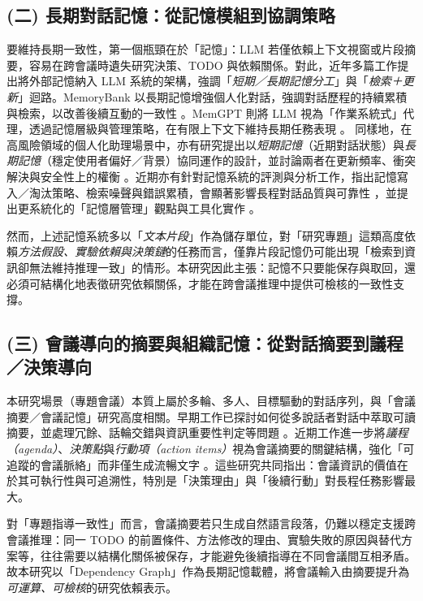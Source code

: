 \subsection*{(二) 長期對話記憶：從記憶模組到協調策略}
要維持長期一致性，第一個瓶頸在於「記憶」：LLM 若僅依賴上下文視窗或片段摘要，容易在跨會議時遺失研究決策、TODO 與依賴關係。對此，近年多篇工作提出將外部記憶納入 LLM 系統的架構，強調「\emph{短期／長期記憶分工}」與「\emph{檢索＋更新}」迴路。MemoryBank 以長期記憶增強個人化對話，強調對話歷程的持續累積與檢索，以改善後續互動的一致性 \citep{a2305_10250v3_memorybank}。MemGPT 則將 LLM 視為「作業系統式」代理，透過記憶層級與管理策略，在有限上下文下維持長期任務表現 \citep{a2310_08560v2_memgpt}。
同樣地，在高風險領域的個人化助理場景中，亦有研究提出以\emph{短期記憶}（近期對話狀態）與\emph{長期記憶}（穩定使用者偏好／背景）協同運作的設計，並討論兩者在更新頻率、衝突解決與安全性上的權衡 \citep{zhang-etal-2024-llm-based}。近期亦有針對記憶系統的評測與分析工作，指出記憶寫入／淘汰策略、檢索噪聲與錯誤累積，會顯著影響長程對話品質與可靠性 \citep{a2402_17753v1_locomomemoryeval,a2505_16067v2_memorymanagementimpacts}，並提出更系統化的「記憶層管理」觀點與工具化實作 \citep{a2504_19413v1_mem0,a2507_07957v1_mirix}。

然而，上述記憶系統多以「\emph{文本片段}」作為儲存單位，對「研究專題」這類高度依賴\emph{方法假設、實驗依賴與決策鏈}的任務而言，僅靠片段記憶仍可能出現「檢索到資訊卻無法維持推理一致」的情形。本研究因此主張：記憶不只要能保存與取回，還必須可結構化地表徵研究依賴關係，才能在跨會議推理中提供可檢核的一致性支撐。

\subsection*{(三) 會議導向的摘要與組織記憶：從對話摘要到議程／決策導向}
本研究場景（專題會議）本質上屬於多輪、多人、目標驅動的對話序列，與「會議摘要／會議記憶」研究高度相關。早期工作已探討如何從多說話者對話中萃取可讀摘要，並處理冗餘、話輪交錯與資訊重要性判定等問題 \citep{zechner2001concise_dialogue_summaries,wang-cardie-2011-summarizing}。近期工作進一步將\emph{議程（agenda）}、\emph{決策點}與\emph{行動項（action items）}視為會議摘要的關鍵結構，強化「可追蹤的會議脈絡」而非僅生成流暢文字 \citep{liu2025agendaaware_meetingsum,laskar-etal-2023-building}。這些研究共同指出：會議資訊的價值在於其可執行性與可追溯性，特別是「決策理由」與「後續行動」對長程任務影響最大。

對「專題指導一致性」而言，會議摘要若只生成自然語言段落，仍難以穩定支援跨會議推理：同一 TODO 的前置條件、方法修改的理由、實驗失敗的原因與替代方案等，往往需要以結構化關係被保存，才能避免後續指導在不同會議間互相矛盾。故本研究以「Dependency Graph」作為長期記憶載體，將會議輸入由摘要提升為\emph{可運算、可檢核}的研究依賴表示。

